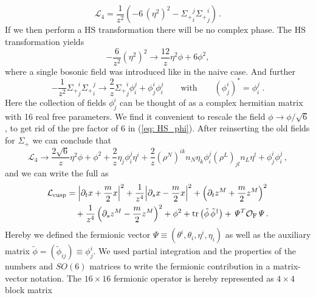 %
%
\begin{equation}
\mathcal{L}_4= \frac{1}{z^2}\left(- 6\, (\eta^2)^2 - {\Sigma_{+}}_i^j{\Sigma_{+}}_j^i \right)\,.
\end{equation}
%
%
If we then perform a HS transformation there will be no complex phase. The HS transformation yields
%
%
\begin{equation}
 -\frac{6}{z^2}(\eta^2)^2\to \frac{12}{z} \eta^2 \phi +6\phi^2,
 \label{eq: HS_phi}
\end{equation}
%
%
where a single bosonic field was introduced like in the naive case. And further
%
%
\begin{equation}
-\frac{1}{z^{2}}{\Sigma_{+}}^{i}_{j}{\Sigma_{+}}^{j}_{i} \rightarrow \frac{2}{z}{\Sigma_{+}}^{i}_{j}\phi^{j}_{i} + \phi^{i}_{j}\phi^{j}_{i}
\qquad \text{with} \qquad \left(\phi^{i}_{j}\right)^{\ast} = \phi^{j}_{i}\;.
\end{equation}
%
%
Here the collection of fields $\phi^{i}_{j}$ can be thought of as a complex hermitian matrix with 16 real free parameters. We find it convenient to rescale the field $\phi \to \phi / \sqrt{6}$, to get rid of the pre factor of 6 in (\ref{eq: HS_phi}). After reinserting the old fields for $\Sigma_{+}$ we can conclude that
%
%
\begin{equation}
 \mathcal{L}_4\to \frac{2\sqrt{6}}{z} \eta^2 \phi +\phi^2+\frac{2}{z}\eta_j \phi^j_i \eta^i +\frac{2}{z} (\rho^N)^{ik}n_N \eta_k\phi^j_i  (\rho^L)_{jl}n_L  \eta^l+\phi^i_j \phi^j_i\,,
\end{equation}
%
%
and we can write the full  as
%
%
\begin{align}
\mathcal{L}_{\rm cusp} &=  {\left\vert \partial_t {x} + {\frac{m}{2}}{x} \right\vert}^2 + \frac{1}{{ z}^4}{\left\vert \partial_s {x} -\frac{m}{2}{x} \right\vert}^2 + \left(\partial_t {z}^M + \frac{m}{2}{z}^M \right)^2 \\ &\quad+ \frac{1}{{ z}^4} \left(\partial_s {z}^M -\frac{m}{2}{z}^M\right)^2
+ \phi^2 + {\rm tr} \left( \tilde{\phi}\, \tilde{\phi}^{\dagger} \right) + \mathit{\Psi}^T \mathcal{O}_{\rm F} \mathit{\Psi} \,. \notag
\end{align}
%
%
Hereby we defined the fermionic vector $\mathit{\Psi}\equiv (\theta^{i},\theta_{i},\eta^{i},\eta_{i})$ as well as the auxiliary matrix ${\tilde{\phi}= (\tilde{\phi}_{ij}) \equiv \phi^{i}_{j}}$. We used partial integration and the properties of the  numbers and $SO(6)$ matrices to write the fermionic contribution in a matrix-vector notation. The $16\times 16$ fermionic operator is hereby represented as $4\times 4$ block matrix
